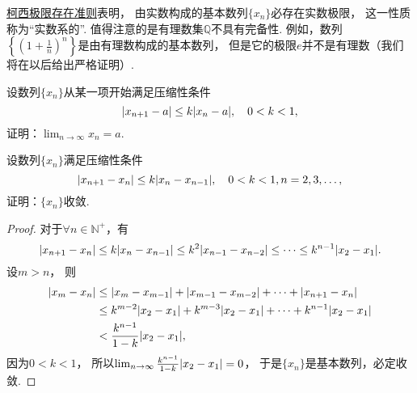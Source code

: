 \hyperref[theorem:极限.数列的柯西极限存在准则]{柯西极限存在准则}表明，
由实数构成的基本数列\(\{x_n\}\)必存在实数极限，
这一性质称为“实数系的”.
值得注意的是有理数集\(\mathbb{Q}\)不具有完备性.
例如，数列\(\left\{\left(1+\frac1n\right)^n\right\}\)是由有理数构成的基本数列，
但是它的极限\(e\)并不是有理数（我们将在以后给出严格证明）.%

\begin{example}\label{example:收敛准则.压缩映射原理1}
设数列\(\{x_n\}\)从某一项开始满足压缩性条件\[
	\abs{x_{n+1} - a}
	\leq k \abs{x_n - a},
	\quad 0<k<1,
\]
证明：\(\lim_{n\to\infty} x_n = a\).
\end{example}

\begin{example}\label{example:收敛准则.压缩映射原理2}
设数列\(\{x_n\}\)满足压缩性条件\[
	\abs{x_{n+1} - x_n}
	\leq k \abs{x_n - x_{n-1}},
	\quad 0<k<1, n=2,3,\dotsc,
\]
证明：\(\{x_n\}\)收敛.
\begin{proof}
对于\(\forall n\in\mathbb{N}^+\)，有\[
	\abs{x_{n+1} - x_n}
	\leq k \abs{x_n - x_{n-1}}
	\leq k^2 \abs{x_{n-1} - x_{n-2}}
	\leq \dotsb
	\leq k^{n-1} \abs{x_2 - x_1}.
\]
设\(m > n\)，
则\begin{align*}
	\abs{x_m - x_n}
	&\leq \abs{x_m - x_{m-1}}
	+ \abs{x_{m-1} - x_{m-2}}
	+ \dotsb + \abs{x_{n+1} - x_n} \\
	&\leq k^{m-2} \abs{x_2 - x_1}
	+ k^{m-3} \abs{x_2 - x_1}
	+ \dotsb + k^{n-1} \abs{x_2 - x_1} \\
	&< \frac{k^{n-1}}{1-k} \abs{x_2 - x_1},
\end{align*}
因为\(0<k<1\)，
所以\(\lim_{n\to\infty} \frac{k^{n-1}}{1-k} \abs{x_2 - x_1} = 0\)，
于是\(\{x_n\}\)是基本数列，必定收敛.
\end{proof}
\end{example}
